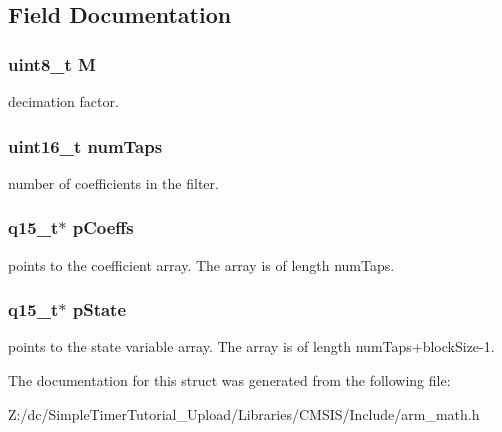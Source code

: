 \subsection{Field Documentation}
\hypertarget{structarm__fir__decimate__instance__q15_ae2c8107d00d3c9942e7a20fc598edecf}{
\subsubsection[{M}]{\setlength{\rightskip}{0pt plus 5cm}uint8\-\_\-t M}}\label{structarm__fir__decimate__instance__q15_ae2c8107d00d3c9942e7a20fc598edecf}
decimation factor. \hypertarget{structarm__fir__decimate__instance__q15_a751941891e47f522a7f5375fe8990aac}{
\subsubsection[{num\-Taps}]{\setlength{\rightskip}{0pt plus 5cm}uint16\-\_\-t num\-Taps}}\label{structarm__fir__decimate__instance__q15_a751941891e47f522a7f5375fe8990aac}
number of coefficients in the filter. \hypertarget{structarm__fir__decimate__instance__q15_a7ca181a37f714d174445f486bebce26f}{
\subsubsection[{p\-Coeffs}]{\setlength{\rightskip}{0pt plus 5cm}q15\-\_\-t$\ast$ p\-Coeffs}}\label{structarm__fir__decimate__instance__q15_a7ca181a37f714d174445f486bebce26f}
points to the coefficient array. The array is of length num\-Taps. \hypertarget{structarm__fir__decimate__instance__q15_ae29dfdb736374fcddaeaec4b7770170c}{
\subsubsection[{p\-State}]{\setlength{\rightskip}{0pt plus 5cm}q15\-\_\-t$\ast$ p\-State}}\label{structarm__fir__decimate__instance__q15_ae29dfdb736374fcddaeaec4b7770170c}
points to the state variable array. The array is of length num\-Taps+block\-Size-\/1. 

The documentation for this struct was generated from the following file\-:\begin{DoxyCompactItemize}
\item 
Z\-:/dc/\-Simple\-Timer\-Tutorial\-\_\-\-Upload/\-Libraries/\-C\-M\-S\-I\-S/\-Include/arm\-\_\-math.\-h\end{DoxyCompactItemize}
